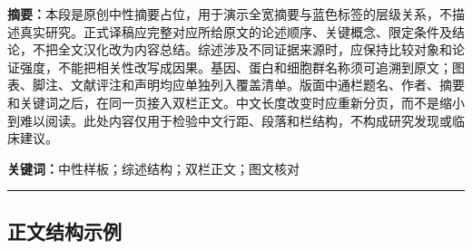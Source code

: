 \documentclass[UTF8,fontset=none,scheme=plain]{ctexart}
\begin{document}
\sffamily\normalsize
{}
\thispagestyle{ahafirst}
\noindent\textbf{\color{AhaHeading}摘要：}本段是原创中性摘要占位，用于演示全宽摘要与蓝色标签的层级关系，不描述真实研究。正式译稿应完整对应所给原文的论述顺序、关键概念、限定条件及结论，不把全文汉化改为内容总结。综述涉及不同证据来源时，应保持比较对象和论证强度，不能把相关性改写成因果。基因、蛋白和细胞群名称须可追溯到原文；图表、脚注、文献评注和声明均应单独列入覆盖清单。版面中通栏题名、作者、摘要和关键词之后，在同一页接入双栏正文。中文长度改变时应重新分页，而不是缩小到难以阅读。此处内容仅用于检验中文行距、段落和栏结构，不构成研究发现或临床建议。
\begin{center}{\fontsize{8bp}{10bp}\selectfont\textbf{\color{AhaHeading}关键词：}中性样板；综述结构；双栏正文；图文核对}\end{center}
\noindent\rule{\textwidth}{.5bp}\par\vspace{8bp}
\begin{ahacols}
\section*{正文结构示例}
\AhaBody
\end{ahacols}
\vfill\AhaOpeningNotes

\clearpage
\end{document}
